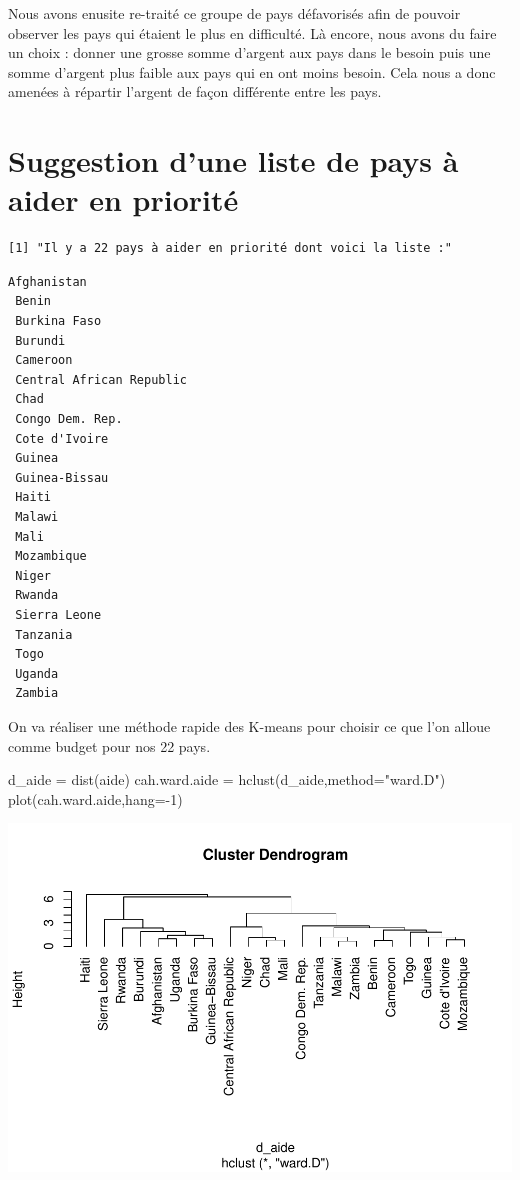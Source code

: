 \documentclass[
]{article}
\newenvironment{Shaded}{}{}
\newcommand{\AttributeTok}[1]{#1}
\newcommand{\DecValTok}[1]{#1}
\newcommand{\FunctionTok}[1]{#1}
\newcommand{\NormalTok}[1]{#1}
\newcommand{\OtherTok}[1]{\textcolor[rgb]{1.00,0.25,0.00}{#1}}
\newcommand{\SpecialCharTok}[1]{\textcolor[rgb]{0.00,0.50,0.50}{#1}}
\newcommand{\StringTok}[1]{\textcolor[rgb]{0.00,0.50,0.50}{#1}}
\begin{document}
Nous avons enusite re-traité ce groupe de pays défavorisés afin de
pouvoir observer les pays qui étaient le plus en difficulté. Là encore,
nous avons du faire un choix : donner une grosse somme d'argent aux pays
dans le besoin puis une somme d'argent plus faible aux pays qui en ont
moins besoin. Cela nous a donc amenées à répartir l'argent de façon
différente entre les pays.

\hypertarget{suggestion-dune-liste-de-pays-uxe0-aider-en-priorituxe9}{%
\section{Suggestion d'une liste de pays à aider en
priorité}\label{suggestion-dune-liste-de-pays-uxe0-aider-en-priorituxe9}}

\begin{verbatim}
[1] "Il y a 22 pays à aider en priorité dont voici la liste :"
\end{verbatim}

\begin{verbatim}
Afghanistan 
 Benin 
 Burkina Faso 
 Burundi 
 Cameroon 
 Central African Republic 
 Chad 
 Congo Dem. Rep. 
 Cote d'Ivoire 
 Guinea 
 Guinea-Bissau 
 Haiti 
 Malawi 
 Mali 
 Mozambique 
 Niger 
 Rwanda 
 Sierra Leone 
 Tanzania 
 Togo 
 Uganda 
 Zambia 
\end{verbatim}

On va réaliser une méthode rapide des K-means pour choisir ce que l'on
alloue comme budget pour nos 22 pays.

\begin{Shaded}
\begin{Highlighting}[]
\NormalTok{d\_aide }\OtherTok{=} \FunctionTok{dist}\NormalTok{(aide)}
\NormalTok{cah.ward.aide }\OtherTok{=} \FunctionTok{hclust}\NormalTok{(d\_aide,}\AttributeTok{method=}\StringTok{"ward.D"}\NormalTok{)}
\FunctionTok{plot}\NormalTok{(cah.ward.aide,}\AttributeTok{hang=}\SpecialCharTok{{-}}\DecValTok{1}\NormalTok{)}
\end{Highlighting}
\end{Shaded}

\includegraphics{Projet_files/figure-latex/unnamed-chunk-40-1.pdf}
\end{document}
